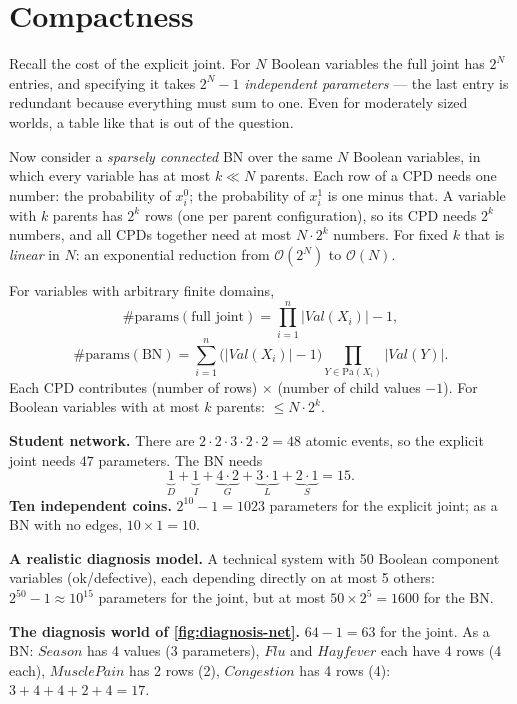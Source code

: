 \documentclass[11pt, oneside]{book}
\newcommand{\abs}[1]{\left\lvert #1 \right\rvert}
\newcommand{\bigO}[1]{\mathcal{O}\!\left(#1\right)}
\newcommand{\Val}{\mathit{Val}}          %
\newcommand{\Pa}{\mathrm{Pa}}            %
\newcommand{\vn}[1]{\mathit{#1}}         %
\let\originalsection\section
\renewcommand{\section}{\Needspace{7\baselineskip}\originalsection}
\begin{document}
\section{Compactness}
\label{sec:compactness}

Recall the cost of the explicit joint. For $N$ Boolean variables the full
joint has $2^N$ entries, and specifying it takes $2^N - 1$ \emph{independent
parameters} --- the last entry is redundant because everything must sum to
one. Even for moderately sized worlds, a table like that is out of the
question.

Now consider a \emph{sparsely connected} BN over the same $N$ Boolean
variables, in which every variable has at most $k \ll N$ parents. Each row of a
CPD needs one number: the probability of $x_i^0$; the probability of $x_i^1$
is one minus that. A variable with $k$ parents has $2^k$ rows (one per parent
configuration), so its CPD needs $2^k$ numbers, and all CPDs together need at
most $N \cdot 2^k$ numbers. For fixed $k$ that is \emph{linear} in $N$: an
exponential reduction from $\bigO{2^N}$ to $\bigO{N}$.

\begin{thmbox}[title={Counting independent parameters}]
For variables with arbitrary finite domains,
\[
\#\text{params}(\text{full joint}) = \prod_{i=1}^{n} \abs{\Val(X_i)} - 1,
\]
\[
\#\text{params}(\text{BN}) = \sum_{i=1}^{n}
  \Big(\abs{\Val(X_i)} - 1\Big) \prod_{Y \in \Pa(X_i)} \abs{\Val(Y)} .
\]
Each CPD contributes (number of rows) $\times$ (number of child values $- 1$).
For Boolean variables with at most $k$ parents: $\leq N \cdot 2^k$.
\end{thmbox}

\begin{exbox}[title={Counting parameters in the examples}]
\textbf{Student network.} There are $2 \cdot 2 \cdot 3 \cdot 2 \cdot 2 = 48$
atomic events, so the explicit joint needs $47$ parameters. The BN needs
\[
\underbrace{1}_{D} + \underbrace{1}_{I} + \underbrace{4 \cdot 2}_{G} +
\underbrace{3 \cdot 1}_{L} + \underbrace{2 \cdot 1}_{S} = 15 .
\]
\textbf{Ten independent coins.} $2^{10} - 1 = 1023$ parameters for the
explicit joint; as a BN with no edges, $10 \times 1 = 10$.\par
\textbf{A realistic diagnosis model.} A technical system with 50 Boolean
component variables (ok/defective), each depending directly on at most 5
others: $2^{50} - 1 \approx 10^{15}$ parameters for the joint, but at most
$50 \times 2^5 = 1600$ for the BN.\par
\textbf{The diagnosis world of \cref{fig:diagnosis-net}.} $64 - 1 = 63$ for the
joint. As a BN: $\vn{Season}$ has 4 values (3 parameters), $\vn{Flu}$ and
$\vn{Hayfever}$ each have 4 rows (4 each), $\vn{MusclePain}$ has 2 rows (2),
$\vn{Congestion}$ has 4 rows (4): $3 + 4 + 4 + 2 + 4 = 17$.
\end{exbox}
\end{document}
